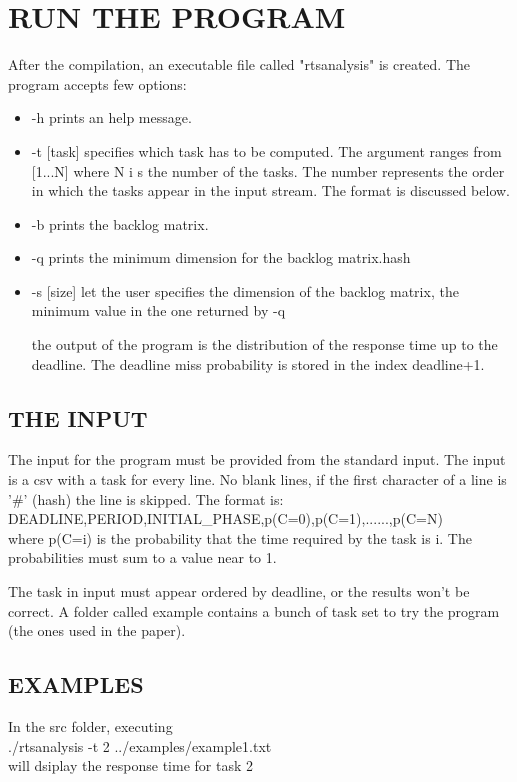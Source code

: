 \documentclass[a4paper]{article}
\begin{document}
\section{RUN THE PROGRAM}
After the compilation, an executable file called "rtsanalysis" is created. The program accepts few options:
\begin{itemize}
\item -h prints an help message.
\item -t [task] specifies which task has to be computed. The argument ranges from [1...N] where N i s the number of the tasks. The number represents the order in which the tasks appear in the input stream. The format is discussed below.
\item -b prints the backlog matrix.
\item -q prints the minimum dimension for the backlog matrix.hash
\item -s [size] let the user specifies the dimension of the backlog matrix, the minimum value in the one returned by -q

the output of the program is the distribution of the response time up to the deadline. The deadline miss probability is stored in the index deadline+1.
\end{itemize}

\subsection{THE INPUT}
The input for the program must be provided from the standard input. The input is a csv with a task for every line. No blank lines, if the first character of a line is '\#' (hash) the line is skipped. The format is: \\
DEADLINE,PERIOD,INITIAL\_PHASE,p(C=0),p(C=1),......,p(C=N) \\
where p(C=i) is the probability that the time required by the task is i. The probabilities must sum to a value near to 1.

The task in input must appear ordered by deadline, or the results won't be correct. A folder called example contains a bunch of task set to try the program (the ones used in the paper).

\subsection{EXAMPLES}

In the src folder, executing \\

./rtsanalysis -t 2  ../examples/example1.txt \\
 will dsiplay the response time for task 2 \\
\end{document}
